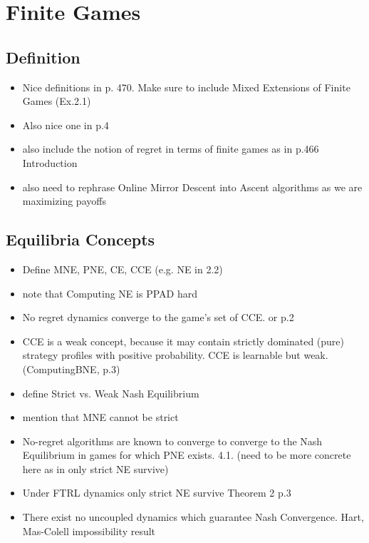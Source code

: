 
\chapter{Finite Games}\label{chapter:finiteGames}

\section{Definition}\label{section:definition}

\begin{itemize}
    \item Nice definitions in \cite{mertikopoulos} p. 470. Make sure to include Mixed Extensions of Finite Games (Ex.2.1)
    \item Also nice one in \cite{flokas} p.4
    \item also include the notion of regret in terms of finite games as in \cite{mertikopoulos} p.466 Introduction
    \item also need to rephrase Online Mirror Descent into Ascent algorithms as we are maximizing payoffs
\end{itemize}


\section{Equilibria Concepts}\label{section:equilibriaConcepts}

\begin{itemize}
    \item Define MNE, PNE, CE, CCE (e.g. NE in \cite{mertikopoulos} 2.2)
    \item note that Computing NE is PPAD hard
    \item No regret dynamics converge to the game's set of CCE. \cite{jafari} or \cite{flokas} p.2
    \item CCE is a weak concept, because it may contain strictly dominated (pure) strategy profiles with positive probability. CCE is learnable but weak. (ComputingBNE, p.3)
    \item define Strict vs. Weak Nash Equilibrium
    \item mention that MNE cannot be strict
    \item No-regret algorithms are known to converge to converge to the Nash Equilibrium in games for which PNE exists.\cite{jafari} 4.1. (need to be more concrete here as in \cite{mertikopoulos} only strict NE survive)
    \item Under FTRL dynamics only strict NE survive \cite{flokas} Theorem 2 p.3
    \item There exist no uncoupled dynamics which guarantee Nash Convergence. Hart, Mas-Colell impossibility result \cite{hart}
\end{itemize}

